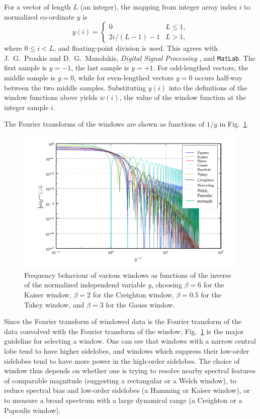 For a vector of length $L$ (an integer), the mapping from integer array
index $i$ to normalized co-ordinate $y$ is
\begin{equation}
y(i)
   = \left\{ \begin{array}{ll}
   0 & L \le 1, \\
   2 i / (L - 1) - 1 & L > 1,
   \end{array} \right.
\end{equation}
where $0 \le i < L$, and floating-point division is used.  This agrees with
J.~G.~Proakis and D.~G.~Manolakis, \textit{Digital Signal Processing}
\cite{pm}, and \texttt{MatLab}.  The first sample is $y = -1$, the last
sample is $y = +1$.  For odd-lengthed vectors, the middle sample is $y =
0$, while for even-lengthed vectors $y = 0$ occurs half-way between the two
middle samples.  Substituting $y(i)$ into the definitions of the window
functions above yields $w(i)$, the value of the window function at the
integer sample $i$.

The Fourier transforms of the windows are shown as functions of $1 / y$ in
Fig.~\ref{f:window-f}.
\begin{figure}
\begin{center}
\includegraphics{window_f}
\end{center}
\caption{\label{f:window-f} Frequency behaviour of various windows as
functions of the inverse of the normalized independend variable $y$,
choosing $\beta = 6$ for the Kaiser window, $\beta = 2$ for the Creighton
window, $\beta = 0.5$ for the Tukey window, and $\beta = 3$ for the Gauss
window.}
\end{figure}
Since the Fourier transform of windowed data is the Fourier transform of
the data convolved with the Fourier transform of the window,
Fig.~\ref{f:window-f} is the major guideline for selecting a window.  One
can see that windows with a narrow central lobe tend to have higher
sidelobes, and windows which suppress their low-order sidelobes tend to
have more power in the high-order sidelobes.  The choice of window thus
depends on whether one is trying to resolve nearby spectral features of
comparable magnitude (suggesting a rectangular or a Welch window), to
reduce spectral bias and low-order sidelobes (a Hamming or Kaiser window),
or to measure a broad spectrum with a large dynamical range (a Creighton or
a Papoulis window).


